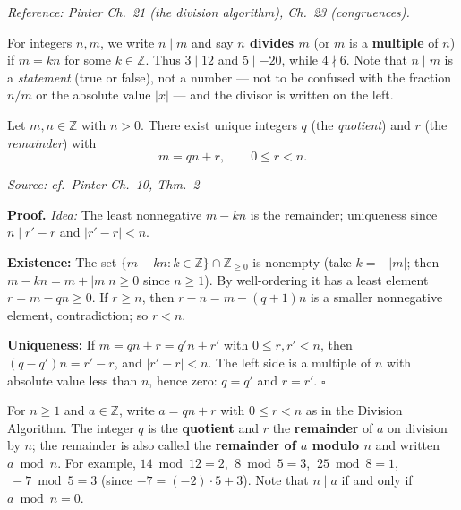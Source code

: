 \documentclass[11pt]{report}
\renewenvironment{proof}[1][Proof]{\noindent\textbf{#1.} }{\hfill$\square$\par\vspace{5pt}}
\newcommand{\srcline}[1]{\par\hfill{\footnotesize\textit{Source: #1}}}
\begin{document}
\textit{Reference: Pinter Ch.\ 21 (the division algorithm), Ch.\ 23 (congruences).}


\begin{defbox}[Divisibility]\label{def:divisibility}
For integers $n, m$, we write $n \mid m$ and say \textbf{$n$ divides $m$} (or $m$ is a \textbf{multiple} of $n$) if $m = kn$ for some $k \in \mathbb{Z}$. Thus $3 \mid 12$ and $5 \mid -20$, while $4 \nmid 6$. Note that $n \mid m$ is a \emph{statement} (true or false), not a number --- not to be confused with the fraction $n/m$ or the absolute value $|x|$ --- and the divisor is written on the left.
\end{defbox}

\begin{lembox}\label{lem:division-algorithm}
Let $m, n \in \mathbb{Z}$ with $n > 0$. There exist unique integers $q$ (the \emph{quotient}) and $r$ (the \emph{remainder}) with
\[ m = qn + r, \qquad 0 \leq r < n. \]
\srcline{cf.\ Pinter Ch.\ 10, Thm.\ 2}
\end{lembox}

\begin{proof}
\textit{Idea:} The least nonnegative $m - kn$ is the remainder; uniqueness since $n \mid r' - r$ and $|r' - r| < n$.\par
\textbf{Existence:} The set $\{m - kn : k \in \mathbb{Z}\} \cap \mathbb{Z}_{\geq 0}$ is nonempty (take $k = -|m|$; then $m - kn = m + |m| n \geq 0$ since $n \geq 1$). By well-ordering it has a least element $r = m - qn \geq 0$. If $r \geq n$, then $r - n = m - (q+1)n$ is a smaller nonnegative element, contradiction; so $r < n$.

\textbf{Uniqueness:} If $m = qn + r = q'n + r'$ with $0 \leq r, r' < n$, then $(q - q')n = r' - r$, and $|r' - r| < n$. The left side is a multiple of $n$ with absolute value less than $n$, hence zero: $q = q'$ and $r = r'$.
\end{proof}

\begin{defbox}\label{def:quotient-remainder-a-n}
For $n \geq 1$ and $a \in \mathbb{Z}$, write $a = qn + r$ with $0 \leq r < n$ as in the Division Algorithm. The integer $q$ is the \textbf{quotient} and $r$ the \textbf{remainder} of $a$ on division by $n$; the remainder is also called the \textbf{remainder of $a$ modulo $n$} and written $a \bmod n$. For example, $14 \bmod 12 = 2$, $\ 8 \bmod 5 = 3$, $\ 25 \bmod 8 = 1$, $\ -7 \bmod 5 = 3$ (since $-7 = (-2)\cdot 5 + 3$). Note that $n \mid a$ if and only if $a \bmod n = 0$.
\end{defbox}
\end{document}

